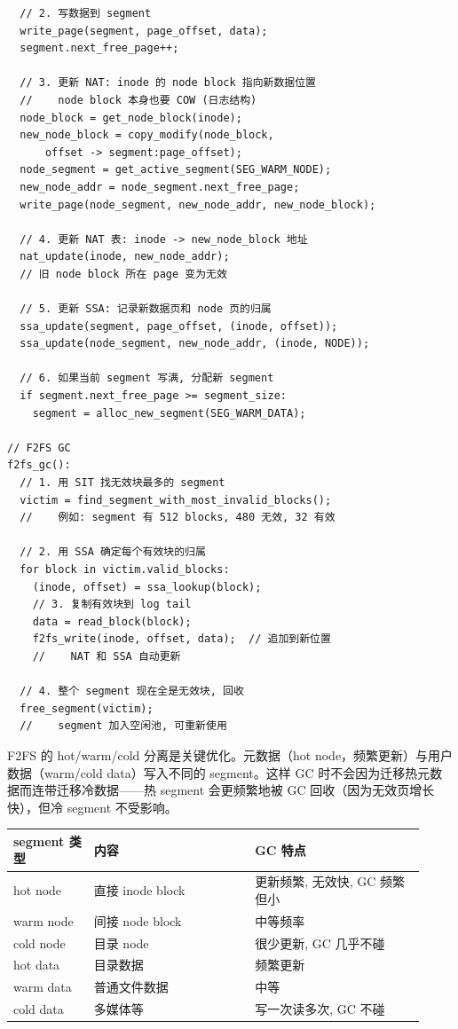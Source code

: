 \begin{filesystemlayout}
\begin{lstlisting}
  // 2. 写数据到 segment
  write_page(segment, page_offset, data);
  segment.next_free_page++;

  // 3. 更新 NAT: inode 的 node block 指向新数据位置
  //    node block 本身也要 COW (日志结构)
  node_block = get_node_block(inode);
  new_node_block = copy_modify(node_block,
      offset -> segment:page_offset);
  node_segment = get_active_segment(SEG_WARM_NODE);
  new_node_addr = node_segment.next_free_page;
  write_page(node_segment, new_node_addr, new_node_block);

  // 4. 更新 NAT 表: inode -> new_node_block 地址
  nat_update(inode, new_node_addr);
  // 旧 node block 所在 page 变为无效

  // 5. 更新 SSA: 记录新数据页和 node 页的归属
  ssa_update(segment, page_offset, (inode, offset));
  ssa_update(node_segment, new_node_addr, (inode, NODE));

  // 6. 如果当前 segment 写满, 分配新 segment
  if segment.next_free_page >= segment_size:
    segment = alloc_new_segment(SEG_WARM_DATA);

// F2FS GC
f2fs_gc():
  // 1. 用 SIT 找无效块最多的 segment
  victim = find_segment_with_most_invalid_blocks();
  //    例如: segment 有 512 blocks, 480 无效, 32 有效

  // 2. 用 SSA 确定每个有效块的归属
  for block in victim.valid_blocks:
    (inode, offset) = ssa_lookup(block);
    // 3. 复制有效块到 log tail
    data = read_block(block);
    f2fs_write(inode, offset, data);  // 追加到新位置
    //    NAT 和 SSA 自动更新

  // 4. 整个 segment 现在全是无效块, 回收
  free_segment(victim);
  //    segment 加入空闲池, 可重新使用
\end{lstlisting}

F2FS 的 hot/warm/cold 分离是关键优化。元数据（hot node，频繁更新）与用户数据（warm/cold data）写入不同的 segment。这样 GC 时不会因为迁移热元数据而连带迁移冷数据——热 segment 会更频繁地被 GC 回收（因为无效页增长快），但冷 segment 不受影响。

\begin{longtable}{|F{0.18\linewidth}|F{0.36\linewidth}|F{0.38\linewidth}|}
\toprule
{}
segment 类型 & 内容 & GC 特点 \\
\midrule
hot node & 直接 inode block & 更新频繁, 无效快, GC 频繁但小 \\\tablerowrule
warm node & 间接 node block & 中等频率 \\\tablerowrule
cold node & 目录 node & 很少更新, GC 几乎不碰 \\\tablerowrule
hot data & 目录数据 & 频繁更新 \\\tablerowrule
warm data & 普通文件数据 & 中等 \\\tablerowrule
cold data & 多媒体等 & 写一次读多次, GC 不碰 \\
\bottomrule
\end{longtable}


\end{filesystemlayout}
